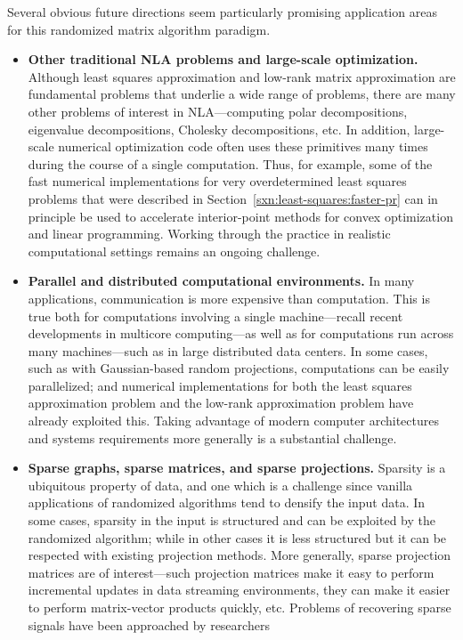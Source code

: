 \documentclass[twoside]{article}
\begin{document}
Several obvious future directions seem particularly promising application 
areas for this randomized matrix algorithm paradigm.
\begin{itemize}
\item
\textbf{Other traditional NLA problems and large-scale optimization.}
Although least squares approximation and low-rank matrix approximation are 
fundamental problems that underlie a wide range of problems, there are many 
other problems of interest in NLA---computing polar decompositions, 
eigenvalue decompositions, Cholesky decompositions, etc.
In addition, large-scale numerical optimization code often uses these 
primitives many times during the course of a single computation.
Thus, for example, some of the fast numerical implementations for very 
overdetermined least squares problems that were described in
Section~\ref{sxn:least-squares:faster-pr} can in principle be used to 
accelerate interior-point methods for convex optimization and linear 
programming.
Working through the practice in realistic computational settings remains
an ongoing challenge.
\item
\textbf{Parallel and distributed computational environments.}
In many applications, communication is more expensive than computation. 
This is true both for computations involving a single machine---recall 
recent developments in multicore computing---as well as for computations 
run across many machines---such as in large distributed data centers.
In some cases, such as with Gaussian-based random projections, computations
can be easily parallelized; and numerical implementations for both the least 
squares approximation problem and the low-rank approximation problem have 
already exploited this.
Taking advantage of modern computer architectures and systems requirements
more generally is a substantial challenge.
\item
\textbf{Sparse graphs, sparse matrices, and sparse projections.}
Sparsity is a ubiquitous property of data, and one which is a challenge 
since vanilla applications of randomized algorithms tend to densify the 
input data.
In some cases, sparsity in the input is structured and can be exploited by
the randomized algorithm; while in other cases it is less structured but it 
can be respected with existing projection methods.
More generally, sparse projection matrices are of interest---such 
projection matrices make it easy to perform incremental updates in data 
streaming environments, they can make it easier to perform matrix-vector 
products quickly, etc.
Problems of recovering sparse signals have been approached by researchers 

\end{itemize}
\end{document}
